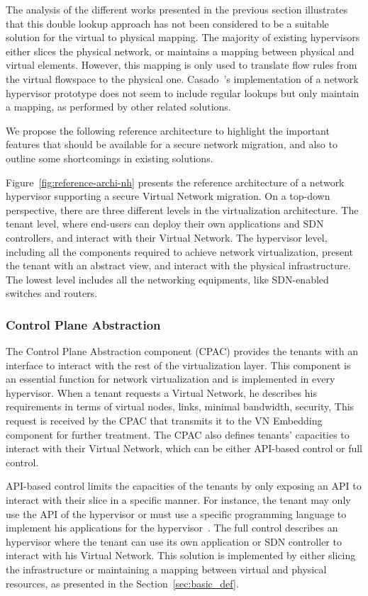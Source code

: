 The analysis of the different works presented in the previous section illustrates that this double lookup approach has not been considered to be a suitable solution for the virtual to physical mapping. The majority of existing hypervisors either slices the physical network, or maintains a mapping between physical and virtual elements. However, this mapping is only used to translate flow rules from the virtual flowspace to the physical one. Casado~\etal's  implementation of a network hypervisor prototype does not seem to include regular lookups but only maintain a mapping, as performed by other related solutions.

We propose the following reference architecture to highlight the important features that should be available for a secure network migration, and also to outline some shortcomings in existing solutions.


  
Figure~\ref{fig:reference-archi-nh} presents the reference architecture of a network hypervisor supporting a secure Virtual Network migration.
On a top-down perspective, there are three different levels in the virtualization architecture.
The tenant level, where end-users can deploy their own applications and SDN controllers, and interact with their Virtual Network.
The hypervisor level, including all the components required to achieve network virtualization, present the tenant with an abstract view, and interact with the physical infrastructure.
The lowest level includes all the networking equipments, like SDN-enabled switches and routers.

\subsubsection{Control Plane Abstraction}
The Control Plane Abstraction component (CPAC) provides the tenants with an interface to interact with the rest of the virtualization layer.
This component is an essential function for network virtualization and is implemented in every hypervisor.
When a tenant requests a Virtual Network, he describes his requirements in terms of virtual nodes, links, minimal bandwidth, security, \etc This request is received by the CPAC that transmits it to the VN Embedding component for further treatment.
The CPAC also defines tenants' capacities to interact with their Virtual Network, which can be either API-based control or full control.

API-based control limits the capacities of the tenants by only exposing an API to interact with their slice in a specific manner. For instance, the tenant may only use the API of the hypervisor or must use a specific programming language to implement his applications for the hypervisor~\cite{CompositionalHypervisor-Jin2014,NetworkHypervisor-Huang2013}. 
The full control describes an hypervisor where the tenant can use its own application or SDN controller to interact with his Virtual Network. This solution is implemented by either slicing the infrastructure or maintaining a mapping between virtual and physical resources, as presented in the Section~\ref{sec:basic_def}.



